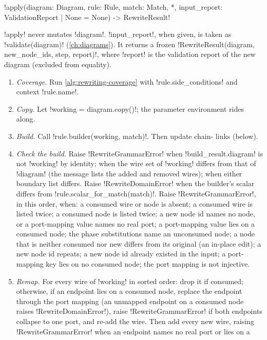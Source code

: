 \begin{signature}
\py!apply(diagram: Diagram, rule: Rule, match: Match, *, input_report: ValidationReport | None = None) -> RewriteResult!
\end{signature}
\py!apply! never mutates \py!diagram!. \py!input_report!, when given, is taken as
\py!validate(diagram)! (\cref{ch:diagrams}). It returns a frozen
\py!RewriteResult(diagram, new_node_ids, step, report)!, where \py!report! is the validation
report of the new diagram (excluded from equality).

\begin{algorithm}\label{alg:rewriting-apply}
\leavevmode
\begin{enumerate}
\item \emph{Coverage.} Run \cref{alg:rewriting-coverage} with \py!rule.side_conditions! and context
  \py!rule.name!.
\item \emph{Copy.} Let \py!working = diagram.copy()!; the parameter environment rides along.
\item \emph{Build.} Call \py!rule.builder(working, match)!. Then update chain-\bbox{} links
  (below).
\item \emph{Check the build.} Raise \py!RewriteGrammarError! when \py!build_result.diagram! is not
  \py!working! by identity; when the wire set of \py!working! differs from that of \py!diagram!
  (the message lists the added and removed wires); when either boundary list differs. Raise
  \py!RewriteDomainError! when the builder's scalar differs from \py!rule.scalar_for_match(match)!.
  Raise \py!RewriteGrammarError!, in this order, when: a consumed wire or node is absent; a consumed
  wire is listed twice; a consumed node is listed twice; a new node id names no node, or a
  port-mapping value names no real port; a port-mapping value lies on a consumed node; the phase
  substitutions name an unconsumed node; a node that is neither consumed nor new differs from its
  original (an in-place edit); a new node id repeats; a new node id already existed in the input; a
  port-mapping key lies on no consumed node; the port mapping is not injective.
\item \emph{Remap.} For every wire of \py!working! in sorted order: drop it if consumed; otherwise,
  if an endpoint lies on a consumed node, replace the endpoint through the port mapping (an
  unmapped endpoint on a consumed node raises \py!RewriteDomainError!), raise
  \py!RewriteGrammarError! if both endpoints collapse to one port, and re-add the wire. Then add
  every new wire, raising \py!RewriteGrammarError! when an endpoint names no real port or lies on a

\end{enumerate}
\end{algorithm}
